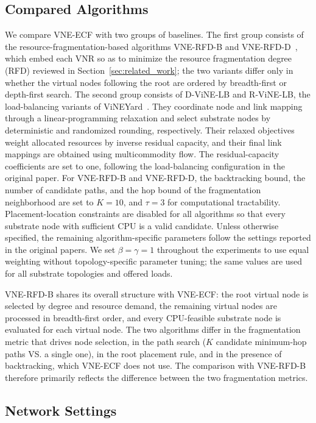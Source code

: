 \documentclass{ieeeaccess}
\newcommand{\ecfvne}{VNE-ECF}
\begin{document}
\subsection{Compared Algorithms}

We compare \ecfvne{} with two groups of baselines. The first group consists of the
resource-fragmentation-based algorithms VNE-RFD-B and VNE-RFD-D~\cite{lu2022resource}, which embed
each VNR so as to minimize the resource fragmentation degree (RFD) reviewed in
Section~\ref{sec:related_work}; the two variants differ only in whether the virtual nodes following
the root are ordered by breadth-first or depth-first search. The
second group consists of D-ViNE-LB and R-ViNE-LB, the load-balancing variants of
ViNEYard~\cite{chowdhury2012vineyard}. They coordinate node and link mapping through a
linear-programming relaxation and select substrate nodes by deterministic and randomized rounding,
respectively. Their relaxed objectives weight allocated resources by inverse residual capacity,
and their final link mappings are obtained using multicommodity flow. The residual-capacity
coefficients are set to one, following the load-balancing configuration in the original paper. For
VNE-RFD-B and VNE-RFD-D, the backtracking bound, the number of candidate paths,
and the hop bound of the fragmentation neighborhood are set to $K=10$, and $\tau=3$
for computational tractability. Placement-location constraints are disabled for all algorithms so
that every substrate node with sufficient CPU is a valid candidate. Unless otherwise specified, the
remaining algorithm-specific parameters follow the settings reported in the original papers. We set $\beta=\gamma=1$ throughout the experiments to use equal weighting without topology-specific parameter tuning; the same values are used for all substrate topologies and offered loads.

VNE-RFD-B shares its overall structure with \ecfvne{}: the root virtual node is selected by degree
and resource demand, the remaining virtual nodes are processed in breadth-first order, and every
CPU-feasible substrate node is evaluated for each virtual node. The two algorithms differ in the
fragmentation metric that drives node selection, in the path search ($K$ candidate minimum-hop paths VS. a single one), in the root placement rule, and in the presence of backtracking, which
\ecfvne{} does not use. The comparison with VNE-RFD-B therefore primarily reflects the difference
between the two fragmentation metrics.

\subsection{Network Settings}
\end{document}

